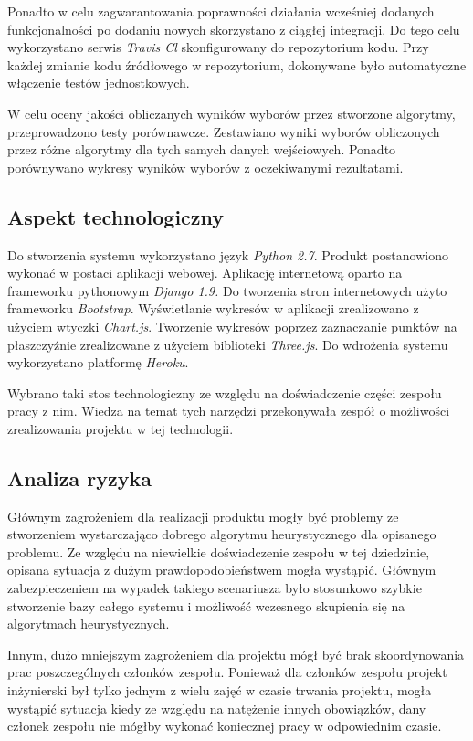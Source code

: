 \documentclass[polish,11pt]{aghthesis}
\begin{document}
Ponadto w celu zagwarantowania poprawności działania wcześniej dodanych
funkcjonalności po dodaniu nowych skorzystano z ciągłej integracji. Do tego celu
wykorzystano serwis \textit{Travis Cl} skonfigurowany do repozytorium kodu. Przy każdej zmianie kodu źródłowego w repozytorium, dokonywane było automatyczne włączenie testów
jednostkowych.  

W celu oceny jakości obliczanych wyników wyborów przez stworzone algorytmy,
przeprowadzono testy porównawcze. Zestawiano wyniki wyborów obliczonych przez różne
algorytmy dla tych samych danych wejściowych. Ponadto porównywano wykresy wyników
wyborów z oczekiwanymi rezultatami.
\clearpage

\subsection{Aspekt technologiczny}
Do stworzenia systemu wykorzystano język \textit{Python 2.7}. Produkt postanowiono wykonać w
postaci aplikacji webowej. Aplikację internetową oparto na frameworku pythonowym \textit{Django 1.9.} 
Do tworzenia stron internetowych użyto frameworku \textit{Bootstrap}. Wyświetlanie wykresów w 
aplikacji zrealizowano z użyciem wtyczki \textit{Chart.js}. Tworzenie wykresów poprzez zaznaczanie punktów na płaszczyźnie zrealizowane z użyciem biblioteki \textit{Three.js}. Do wdrożenia systemu wykorzystano 
platformę \textit{Heroku}.

Wybrano taki stos technologiczny ze względu na doświadczenie części zespołu pracy z nim.
Wiedza na temat tych narzędzi przekonywała zespół o możliwości zrealizowania projektu w
tej technologii.

\subsection{Analiza ryzyka}
Głównym zagrożeniem dla realizacji produktu mogły być problemy ze stworzeniem
wystarczająco dobrego algorytmu heurystycznego dla opisanego problemu. Ze względu na
niewielkie doświadczenie zespołu w tej dziedzinie, opisana sytuacja z dużym prawdopodobieństwem mogła wystąpić. Głównym
zabezpieczeniem na wypadek takiego scenariusza było stosunkowo szybkie stworzenie
bazy całego systemu i możliwość wczesnego skupienia się na algorytmach heurystycznych.

Innym, dużo mniejszym zagrożeniem dla projektu mógł być brak skoordynowania prac
poszczególnych członków zespołu. Ponieważ dla członków zespołu projekt inżynierski był
tylko jednym z wielu zajęć w czasie trwania projektu, mogła wystąpić sytuacja kiedy ze
względu na natężenie innych obowiązków, dany członek zespołu nie mógłby wykonać
koniecznej pracy w odpowiednim czasie.
\newpage
\end{document}
